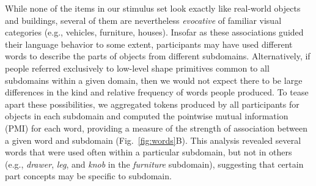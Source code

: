 \documentclass[10pt,letterpaper]{article}
\begin{document}
While none of the items in our stimulus set look exactly like real-world objects and buildings, several of them are nevertheless \textit{evocative} of familiar visual categories (e.g., vehicles, furniture, houses). 
Insofar as these associations guided their language behavior to some extent, participants may have used different words to describe the parts of objects from different subdomains. 
Alternatively, if people referred exclusively to low-level shape primitives common to all subdomains within a given domain, then we would not expect there to be large differences in the kind and relative frequency of words people produced. 
To tease apart these possibilities, we aggregated tokens produced by all participants for objects in each subdomain and computed the pointwise mutual information (PMI) for each word, providing a measure of the strength of association between a given word and subdomain (Fig.~\ref{fig:words}B).
This analysis revealed several words that were used often within a particular subdomain, but not in others (e.g., \textit{drawer}, \textit{leg}, and \textit{knob} in the \textit{furniture} subdomain), suggesting that certain part concepts may be specific to subdomain.
\end{document}
